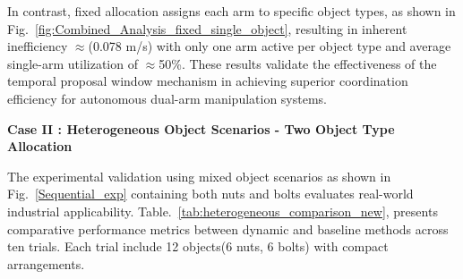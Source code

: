 \documentclass[pdflatex,sn-mathphys-num]{sn-jnl}%
\theoremstyle{thmstyleone}%
\theoremstyle{thmstylethree}%
\begin{document}
In contrast, fixed allocation assigns each arm to specific object types, as shown in Fig.~\ref{fig:Combined_Analysis_fixed_single_object}, resulting in inherent inefficiency $\approx$(0.078 m/s) with only one arm active per object type and average single-arm utilization of $\approx$50\%. These results validate the effectiveness of the temporal proposal window mechanism in achieving superior coordination efficiency for autonomous dual-arm manipulation systems.

\noindent \textbf{Case II : Heterogeneous Object Scenarios - Two Object Type Allocation}

The experimental validation using mixed object scenarios as shown in Fig.~\ref{Sequential_exp} containing both nuts and bolts evaluates real-world industrial applicability. Table.~\ref{tab:heterogeneous_comparison_new}, presents comparative performance metrics between dynamic and baseline methods across ten trials. Each trial include 12 objects(6 nuts, 6 bolts) with compact arrangements.
\end{document}
